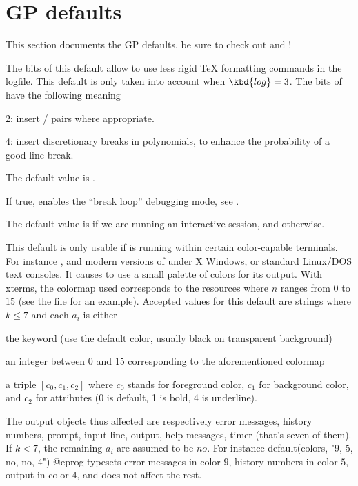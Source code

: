 {\section{GP defaults}
\label{se:gp_defaults} This section documents the GP defaults, be sure to
check out  and  !


\label{se:def,TeXstyle}
The bits of this default allow
 to use less rigid TeX formatting commands in the logfile. This
default is only taken into account when $\kbd{log} = 3$. The bits of
 have the following meaning

2: insert  /  pairs where appropriate.

4: insert discretionary breaks in polynomials, to enhance the probability of
a good line break.

The default value is .

\label{se:def,breakloop}
If true, enables the ``break loop'' debugging mode, see
.

The default value is  if we are running an interactive 
session, and  otherwise.

\label{se:def,colors}
This default is only usable if 
is running within certain color-capable terminals. For instance ,
 and modern versions of  under X Windows, or
standard Linux/DOS text consoles. It causes  to use a small palette of
colors for its output. With xterms, the colormap used corresponds to the
resources  where $n$ ranges from $0$ to $15$ (see the
file  for an example). Accepted values for this
default are strings  where $k\le7$ and each
$a_i$ is either

\noindent\item the keyword  (use the default color, usually
black on transparent background)

\noindent\item an integer between 0 and 15 corresponding to the
aforementioned colormap

\noindent\item a triple $[c_0,c_1,c_2]$ where $c_0$ stands for foreground
color, $c_1$ for background color, and $c_2$ for attributes (0 is default, 1
is bold, 4 is underline).

The output objects thus affected are respectively error messages,
history numbers, prompt, input line, output, help messages, timer (that's
seven of them). If $k < 7$, the remaining $a_i$ are assumed to be $no$. For
instance
%
\bprog
default(colors, "9, 5, no, no, 4")
@eprog
\noindent
typesets error messages in color $9$, history numbers in color $5$, output in
color $4$, and does not affect the rest.

}
